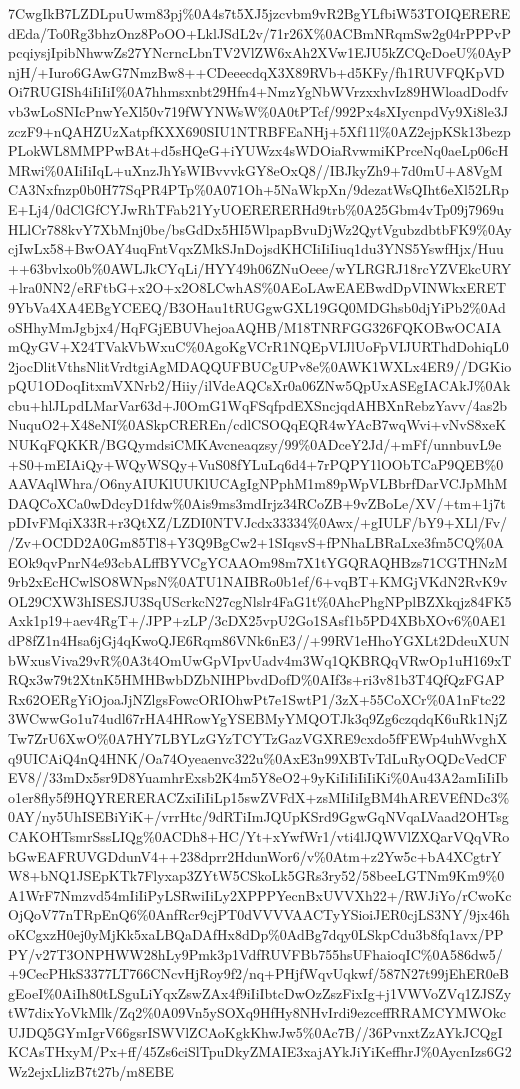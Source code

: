 \documentclass[]{article}
\begin{document}
7CwgIkB7LZDLpuUwm83pj\%0A4s7t5XJ5jzcvbm9vR2BgYLfbiW53TOIQEREREdEda/To0Rg3bhzOnz8PoOO+LklJSdL2v/71r26X\%0ACBmNRqmSw2g04rPPPvPpcqiysjIpibNhwwZs27YNcrncLbnTV2VlZW6xAh2XVw1EJU5kZCQcDoeU\%0AyPnjH/+Iuro6GAwG7NmzBw8++CDeeecdqX3X89RVb+d5KFy/fh1RUVFQKpVDOi7RUGISh4iIiIiI\%0A7hhmsxnbt29Hfn4+NmzYgNbWVrzxxhvIz89HWloadDodfvvb3wLoSNIcPnwYeXl50v719fWYNWsW\%0A0tPTcf/992Px4sXIycnpdVy9Xi8le3JzczF9+nQAHZUzXatpfKXX690SIU1NTRBFEaNHj+5Xf11l\%0AZ2ejpKSk13bezpPLokWL8MMPPwBAt+d5sHQeG+iYUWzx4sWDOiaRvwmiKPrceNq0aeLp06cHMRwi\%0AIiIiIqL+uXnzJhYsWIBvvvkGY8eOxQ8//IBJkyZh9+7d0mU+A8VgMCA3Nxfnzp0b0H77SqPR4PTp\%0A071Oh+5NaWkpXn/9dezatWsQIht6eXl52LRpE+Lj4/0dClGfCYJwRhTFab21YyUOERERERHd9trb\%0A25Gbm4vTp09j7969uHLlCr788kvY7XbMnj0be/bsGdDx5HI5WlpapBvuDjWz2QytVgubzdbtbFK9\%0AycjIwLx58+BwOAY4uqFntVqxZMkSJnDojsdKHCIiIiIiuq1du3YNS5YswfHjx/Huu++63bvlxo0b\%0AWLJkCYqLi/HYY49h06ZNuOeee/wYLRGRJ18rcYZVEkcURY+lra0NN2/eRFtbG+x2O+x2O8LCwhAS\%0AEoLAwEAEBwdDpVINWkxERET9YbVa4XA4EBgYCEEQ/B3OHau1tRUGgwGXL19GQ0MDGhsb0djYiPb2\%0AdoSHhyMmJgbjx4/HqFGjEBUVhejoaAQHB/M18TNRFGG326FQKOBwOCAIAmQyGV+X24TVakVbWxuC\%0AgoKgVCrR1NQEpVIJlUoFpVIJURThdDohiqL02jocDlitVthsNlitVrdtgiAgMDAQQUFBUCgUPv8e\%0AWK1WXLx4ER9//DGKiopQU1ODoqIitxmVXNrb2/Hiiy/ilVdeAQCsXr0a06ZNw5QpUxASEgIACAkJ\%0Akcbu+hlJLpdLMarVar63d+J0OmG1WqFSqfpdEXSncjqdAHBXnRebzYavv/4as2bNuquO2+X48eNI\%0ASkpCREREn/cdlCSOQqEQR4wYAcB7wqWvi+vNvS8xeKNUKqFQKKR/BGQymdsiCMKAvcneaqzsy/99\%0ADceY2Jd/+mFf/unnbuvL9e+S0+mEIAiQy+WQyWSQy+VuS08fYLuLq6d4+7rPQPY1lOObTCaP9QEB\%0AAVAqlWhra/O6nyAIUKlUUKlUCAgIgNPphM1m89pWpVLBbrfDarVCJpMhMDAQCoXCa0wDdcyD1fdw\%0Ais9ms3mdIrjz34RCoZB+9vZBoLe/XV/+tm+1j7tpDIvFMqiX33R+r3QtXZ/LZDI0NTVJcdx33334\%0Awx/+gIULF/bY9+XLl/Fv//Zv+OCDD2A0Gm85Tl8+Y3Q9BgCw2+1SIqsvS+fPNhaLBRaLxe3fm5CQ\%0AEOk9qvPnrN4e93cbALffBYVCgYCAAOm98m7X1tYGQRAQHBzs71CGTHNzM9rb2xEcHCwlSO8WNpsN\%0ATU1NAIBRo0b1ef/6+vqBT+KMGjVKdN2RvK9vOL29CXW3hISESJU3SqUScrkcN27cgNlslr4FaG1t\%0AhcPhgNPplBZXkqjz84FK5Axk1p19+aev4RgT+/JPP+zLP/3cDX25vpU2Go1SAsf1b5PD4XBbXOv6\%0AE1dP8fZ1n4Hsa6jGj4qKwoQJE6Rqm86VNk6nE3//+99RV1eHhoYGXLt2DdeuXUNbWxusViva29vR\%0A3t4OmUwGpVIpvUadv4m3Wq1QKBRQqVRwOp1uH169xTRQx3w79t2XtnK5HMHBwbDZbNIHPbvdDofD\%0AIf3s+ri3v81b3T4QfQzFGAPRx62OERgYiOjoaJjNZlgsFowcORIOhwPt7e1SwtP1/3zX+55CoXCr\%0A1nFtc223WCwwGo1u74udl67rHA4HRowYgYSEBMyYMQOTJk3q9Zg6czqdqK6uRk1NjZTw7ZrU6XwO\%0A7HY7LBYLzGYzTCYTzGazVGXRE9cxdo5fFEWp4uhWvghXq9UICAiQ4nQ4HNK/Oa74Oyeaenvc322u\%0AxE3n99XBTvTdLuRyOQDcVedCFEV8//33mDx5sr9D8YuamhrExsb2K4m5Y8eO2+9yKiIiIiIiIiKi\%0Au43A2amIiIiIbo1er8fly5f9HQYRERERACZxiIiIiLp15swZVFdX+zsMIiIiIgBM4hAREVEfNDc3\%0AY/ny5UhISEBiYiK+/vrrHtc/9dRTiImJQUpKSrd9GgwGqNVqaLVaad2OHTsgCAKOHTsmrSssLIQg\%0ACDh8+HC/Yt+xYwfWr1/vti4lJQWVlZXQarVQqVRobGwEAFRUVGDdunV4++238dprr2HdunWor6/v\%0Atm+z2Yw5c+bA4XCgtrYW8+bNQ1JSEpKTk7Flyxap3ZYtW5CSkoLk5GRs3ry52/58beeLGTNm9Km9\%0A1WrF7Nmzvd54mIiIiPyLSRwiIiLy2XPPPYecnBxUVVXh22+/RWJiYo/rCwoKcOjQoV77nTRpEnQ6\%0AnfRcr9cjPT0dVVVVAACTyYSioiJER0cjLS3NY/9jx46hoKCgxzH0ej0yMjKk5xaLBQaDAfHx8dDp\%0AdBg7dqy0LSkpCdu3b8fq1avx/PPPY/v27T3ONPHWW28hLy9Pmk3p1VdfRUVFBb755hsUFhaioqIC\%0A586dw5/+9CecPHkS3377LT766CNcvHjRoy9f2/nq+PHjfWqvUqkwf/587N27t99jEhER0eBgEoeI\%0AiIh80tLSguLiYqxZswZAx4f9iIiIbtcDwOzZszFixIg+j1VWVoZVq1ZJSZytW7dixYoVkMlk/Zq2\%0A09Vn5ySOXq9HfHy8NHvIrdi9ezceffRRAMCYMWOkcUJDQ5GYmIgrV66gsrISWVlZCAoKgkKhwJw5\%0Ac7B//36PvnxtZzAYkJCQgIKCAsTHxyM/Px+ff/45Zs6ciSlTpuDkyZMAIE3xajAYkJiYiKeffhrJ\%0AycnIzs6G2Wz2ejxLlizB7t27b/m8EBE
\end{document}
